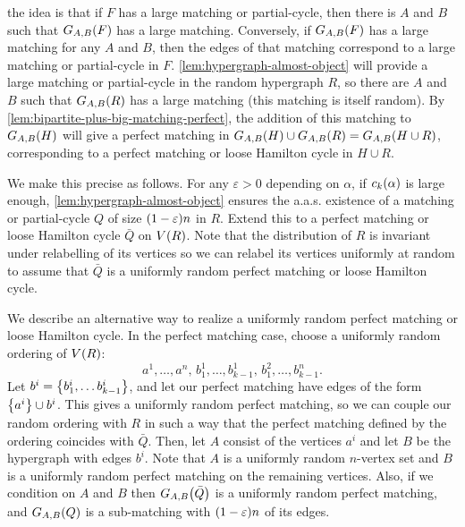 \documentclass[11pt,english]{article}
\theoremstyle{plain}
\theoremstyle{definition}
\theoremstyle{definition}
\theoremstyle{plain}
\theoremstyle{plain}
\theoremstyle{plain}
\theoremstyle{plain}
\theoremstyle{remark}
\theoremstyle{remark}
\let\originalleft\left
\let\originalright\right
\renewcommand{\left}{\mathopen{}\mathclose\bgroup\originalleft}
\renewcommand{\right}{\aftergroup\egroup\originalright}
\begin{document}
the idea is that if $F$ has a large matching or partial-cycle, then there
is $A$ and $B$ such that $G_{A,B}\left(F\right)$ has a large matching. Conversely,
if $G_{A,B}\left(F\right)$ has a large matching for any $A$
and $B$, then the edges of that matching correspond to a large matching or partial-cycle in $F$. \ref{lem:hypergraph-almost-object}
will provide a large matching or partial-cycle in the random hypergraph $R$, so there are $A$
and $B$ such that $G_{A,B}\left(R\right)$ has a large matching (this matching is itself random).
By \ref{lem:bipartite-plus-big-matching-perfect}, the addition of
this matching to $G_{A,B}\left(H\right)$ will give a perfect
matching in $G_{A,B}\left(H\right)\cup G_{A,B}\left(R\right)=G_{A,B}\left(H\cup R\right)$,
corresponding to a perfect matching or loose Hamilton cycle in $H\cup R$.

We make this precise as follows. For any $\varepsilon>0$ depending on $\alpha$, if $\chyp\left(\alpha\right)$
is large enough, \ref{lem:hypergraph-almost-object} ensures the a.a.s.
existence of a matching or partial-cycle $Q$ of size $\left(1-\varepsilon\right)n$
in $R$. Extend this to a perfect matching or loose Hamilton cycle
$\bar{Q}$ on $V\left(R\right)$. Note that the distribution of $R$
is invariant under relabelling of its vertices so we can relabel its
vertices uniformly at random to assume that $\bar{Q}$ is a uniformly
random perfect matching or loose Hamilton cycle.

We describe an alternative way to realize a uniformly random perfect
matching or loose Hamilton cycle. In the perfect matching case, choose a
uniformly random ordering of $V\left(R\right)$: 
\[
a^{1},\dots,a^{n},\, b_{1}^{1},\dots,b_{k-1}^{1},\, b_{1}^{2},\dots,b_{k-1}^{n}.
\]
Let $b^{i}=\left\{ b_{1}^{i},\dots b_{k-1}^{i}\right\}$, and let our perfect matching have edges of the form $\left\{a^{i}\right\}\cup b^i $.
This gives a uniformly random perfect matching, so we can couple our
random ordering with $R$ in such a way that the perfect matching
defined by the ordering coincides with $\bar{Q}$. Then, let $A$
consist of the vertices $a^{i}$ and let $B$ be the hypergraph with
edges $b^i$.
Note that $A$ is a uniformly random $n$-vertex set and $B$ is a
uniformly random perfect matching on the remaining vertices. Also,
if we condition on $A$ and $B$ then $G_{A,B}\left(\bar{Q}\right)$
is a uniformly random perfect matching, and $G_{A,B}\left(Q\right)$
is a sub-matching with $\left(1-\varepsilon\right)n$ of its edges.
\end{document}
